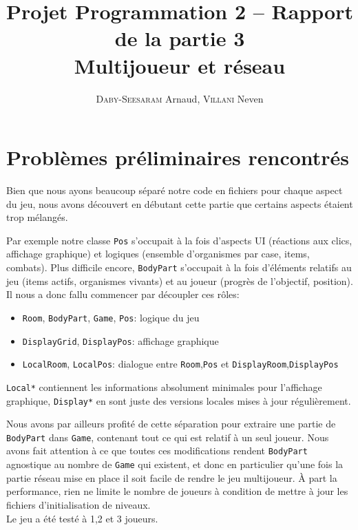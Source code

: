 \documentclass[a4paper,french]{article}
\title{Projet Programmation 2 -- Rapport de la partie 3\\Multijoueur et réseau}
\author{\textsc{Daby-Seesaram} Arnaud, \textsc{Villani} Neven}
\date{}
\newcommand{\ttt}[1]{\texttt{#1}}
\begin{document}
\maketitle

\section{Problèmes préliminaires rencontrés}

Bien que nous ayons beaucoup séparé notre code en fichiers pour chaque aspect du jeu,
nous avons découvert en débutant cette partie que certains aspects étaient trop
mélangés.

Par exemple notre classe \ttt{Pos} s'occupait à la fois d'aspects UI (réactions aux
clics, affichage graphique) et logiques (ensemble d'organismes par case, items, combats).
Plus difficile encore, \ttt{BodyPart} s'occupait à la fois d'éléments relatifs au
jeu (items actifs, organismes vivants) et au joueur (progrès de l'objectif, position).\\

Il nous a donc fallu commencer par découpler ces rôles:
\begin{itemize}
    \item \ttt{Room}, \ttt{BodyPart}, \ttt{Game}, \ttt{Pos}: logique du jeu
    \item \ttt{DisplayGrid}, \ttt{DisplayPos}: affichage graphique
    \item \ttt{LocalRoom}, \ttt{LocalPos}: dialogue entre \ttt{Room},\ttt{Pos} et \ttt{DisplayRoom},\ttt{DisplayPos}
\end{itemize}

\ttt{Local*} contiennent les informations absolument minimales pour l'affichage graphique, \ttt{Display*} en sont
juste des versions locales mises à jour régulièrement.

Nous avons par ailleurs profité de cette séparation pour extraire une partie de
\ttt{BodyPart} dans \ttt{Game}, contenant tout ce qui est relatif à un seul joueur.
Nous avons fait attention à ce que toutes ces modifications rendent \ttt{BodyPart}
agnostique au nombre de \ttt{Game} qui existent, et donc en particulier qu'une fois la
partie réseau mise en place il soit facile de rendre le jeu multijoueur.
\`A part la performance, rien ne limite le nombre de joueurs à condition de mettre à
jour les fichiers d'initialisation de niveaux.\\
Le jeu a été testé à 1,2 et 3 joueurs.\\
\end{document}
